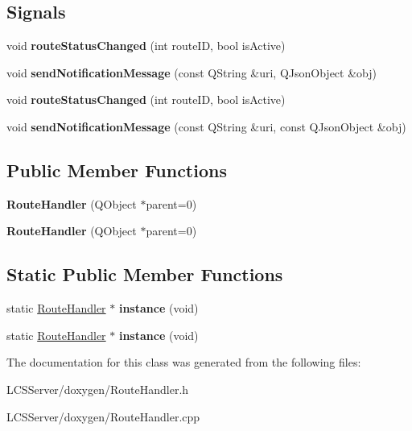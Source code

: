 \subsection*{Signals}
\begin{DoxyCompactItemize}
\item 
\mbox{\label{class_route_handler_a7a1c1d6c86a9eab1b92d28d610bc08c7}} 
void {\bfseries route\+Status\+Changed} (int route\+ID, bool is\+Active)
\item 
\mbox{\label{class_route_handler_a82754bd9037bfb57f2358133e7b3783b}} 
void {\bfseries send\+Notification\+Message} (const Q\+String \&uri, Q\+Json\+Object \&obj)
\item 
\mbox{\label{class_route_handler_a7a1c1d6c86a9eab1b92d28d610bc08c7}} 
void {\bfseries route\+Status\+Changed} (int route\+ID, bool is\+Active)
\item 
\mbox{\label{class_route_handler_ab90117cf6d0221640ec93dbf224a8e3a}} 
void {\bfseries send\+Notification\+Message} (const Q\+String \&uri, const Q\+Json\+Object \&obj)
\end{DoxyCompactItemize}
\subsection*{Public Member Functions}
\begin{DoxyCompactItemize}
\item 
\mbox{\label{class_route_handler_abb9fd855eb9fbbc794f8b3363dc3d408}} 
{\bfseries Route\+Handler} (Q\+Object $\ast$parent=0)
\item 
\mbox{\label{class_route_handler_abb9fd855eb9fbbc794f8b3363dc3d408}} 
{\bfseries Route\+Handler} (Q\+Object $\ast$parent=0)
\end{DoxyCompactItemize}
\subsection*{Static Public Member Functions}
\begin{DoxyCompactItemize}
\item 
\mbox{\label{class_route_handler_a1ffbdae7e97aac32a6cbc125119d1668}} 
static \hyperlink{class_route_handler}{Route\+Handler} $\ast$ {\bfseries instance} (void)
\item 
\mbox{\label{class_route_handler_a0a90c3530ac99d62016837ea975e8efd}} 
static \hyperlink{class_route_handler}{Route\+Handler} $\ast$ {\bfseries instance} (void)
\end{DoxyCompactItemize}


The documentation for this class was generated from the following files\+:\begin{DoxyCompactItemize}
\item 
L\+C\+S\+Server/doxygen/Route\+Handler.\+h\item 
L\+C\+S\+Server/doxygen/Route\+Handler.\+cpp\end{DoxyCompactItemize}
